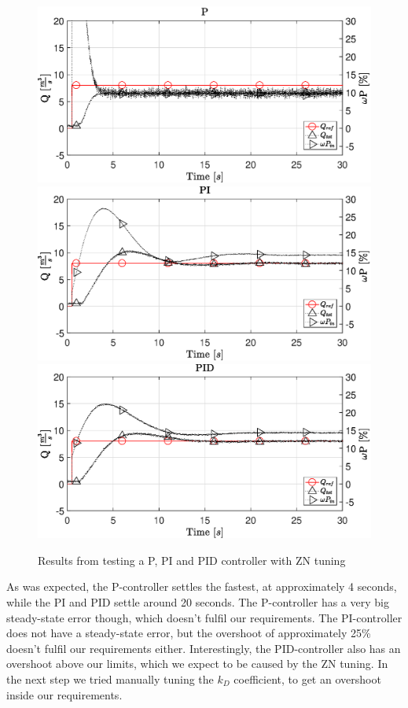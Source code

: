 \begin{figure}[H]
    \centering
    \includegraphics[width=\textwidth]{figures/07controllerDesign/Ptest.eps}
    \includegraphics[width=\textwidth]{figures/07controllerDesign/PItest.eps}
    \includegraphics[width=\textwidth]{figures/07controllerDesign/PIDtest.eps}
    \caption{Results from testing a P, PI and PID controller with ZN tuning}
	\label{fig:PIDtest}
\end{figure}

As was expected, the P-controller settles the fastest,
at approximately 4 seconds,
while the PI and PID settle around 20 seconds.
The P-controller has a very big steady-state error though,
which doesn't fulfil our requirements.
The PI-controller does not have a steady-state error,
but the overshoot of approximately 25\% doesn't fulfil our requirements either.
Interestingly, the PID-controller also has an overshoot above our limits,
which we expect to be caused by the ZN tuning.
In the next step we tried manually tuning the $k_D$ coefficient,
to get an overshoot inside our requirements.

